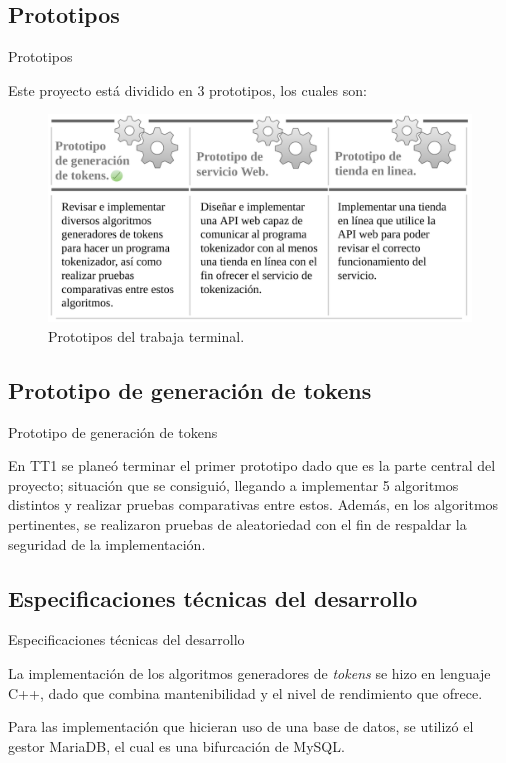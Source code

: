 \subsection{Prototipos} %
\begin{frame}{Prototipos}
  
  Este proyecto está dividido en 3 prototipos, los cuales son:

  \begin{figure}[H]
    \begin{center}
      \includegraphics[width=1.0\linewidth]{diagramas/prototipos.png}
      \caption{Prototipos del trabaja terminal.}
    \end{center}
  \end{figure}

\end{frame}

\subsection{Prototipo de generación de tokens} %
\begin{frame}{Prototipo de generación de tokens}

  En TT1 se planeó terminar el primer prototipo dado que es la parte
  central del proyecto; situación que se consiguió, llegando a implementar
  5 algoritmos distintos y realizar pruebas comparativas entre estos.
  Además, en los algoritmos pertinentes, se realizaron pruebas de
  aleatoriedad con el fin de respaldar la seguridad de la implementación.

\end{frame}

\subsection{Especificaciones técnicas del desarrollo} %
\begin{frame}{Especificaciones técnicas del desarrollo}

  La implementación de los algoritmos generadores de \textit{tokens} se hizo
  en lenguaje C++, dado que combina mantenibilidad y el nivel de rendimiento
  que ofrece.

  Para las implementación que hicieran uso de una base de datos, se utilizó
  el gestor MariaDB, el cual es una bifurcación de MySQL. 

\end{frame}
